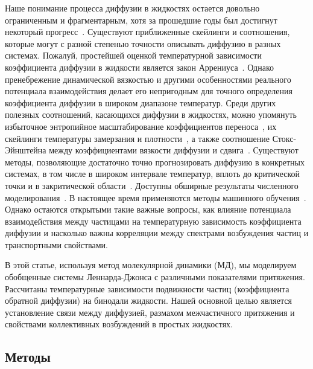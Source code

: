 Наше понимание процесса диффузии в жидкостях остается довольно ограниченным и фрагментарным, хотя за прошедшие годы был достигнут некоторый прогресс~\cite{FrenkelBook,HansenBook,GrootBook,MarchBook}.
Существуют приближенные скейлинги и соотношения, которые могут с разной степенью точности описывать диффузию в разных системах. Пожалуй, простейшей оценкой температурной зависимости коэффициента диффузии в жидкости является закон Аррениуса~\cite{10.1126/science.278.5336.257}. Однако пренебрежение динамической вязкостью и другими особенностями реального потенциала взаимодействия делает его непригодным для точного определения коэффициента диффузии в широком диапазоне температур. Среди других полезных соотношений, касающихся диффузии в жидкостях, можно упомянуть избыточное энтропийное масштабирование коэффициентов переноса~\cite{10.1103/physreva.15.2545, 10.1038/381137a0, 10.1063/1.5055064}, их скейлинги температуры замерзания и плотности~\cite{10.1103/physreve.62.7524, 10.1063/1.5022058, 10.1063/1.5044703, 10.1103/physreve.103.042122}, а также соотношение Стокс-Эйнштейна между коэффициентами вязкости диффузии и сдвига~\cite{10.1063/1.446338, 10.1002/BBPC.19900940313, 10.1103/physreve.95.052122, 10.1063/1.5080662, 10.1080/00268976.2019.1643045}. Существуют методы, позволяющие достаточно точно прогнозировать диффузию в конкретных системах, в том числе в широком интервале температур, вплоть до критической точки и в закритической области~\cite{10.1063/1.1607953, 10.1016/j.camwa.2019.11.012, 10.1063/1.441097}. Доступны обширные результаты численного моделирования~\cite{10.1063/1.1786579, 10.1016/j.fluid.2011.03.002}. В настоящее время применяются методы машинного обучения~\cite{10.1063/5.0011512}.
Однако остаются открытыми такие важные вопросы, как влияние потенциала взаимодействия между частицами на температурную зависимость коэффициента диффузии и насколько важны корреляции между спектрами возбуждения частиц и транспортными свойствами.

В этой статье, используя метод молекулярной динамики (МД), мы моделируем обобщенные системы Леннарда-Джонса с различными показателями притяжения. Рассчитаны температурные зависимости подвижности частиц (коэффициента обратной диффузии) на бинодали жидкости. Нашей основной целью является установление связи между диффузией, размахом межчастичного притяжения и свойствами коллективных возбуждений в простых жидкостях.

\subsection{Методы}
\label{MACR-SecMethods}

